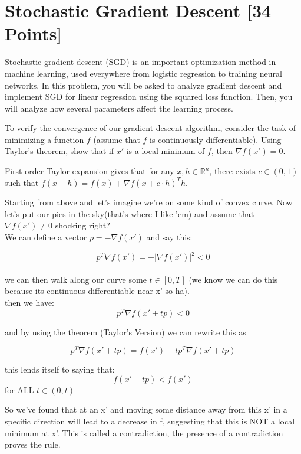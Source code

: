 
\newpage
\section{Stochastic Gradient Descent [34 Points]}

Stochastic gradient descent (SGD) is an important optimization method in machine learning, used everywhere from logistic regression to training neural networks. In this problem, you will be asked to analyze gradient descent and implement SGD for linear regression using the squared loss function. Then, you will analyze how several parameters affect the learning process.

\begin{problem}[3]
    To verify the convergence of our gradient descent algorithm, consider the task of minimizing a function $f$ (assume that $f$ is continuously differentiable). Using Taylor's theorem, show that if $x'$ is a local minimum of $f$, then $\nabla f(x') = 0$. 
\end{problem}
\begin{hint}
  First-order Taylor expansion gives that for any $x, h \in \mathbb{R}^n$, there exists $c \in (0, 1)$ such that $f(x + h) = f(x) + \nabla f(x + c\cdot h)^T h$.
  
\end{hint}
\begin{solution}
Starting from above and let's imagine we're on some kind of convex curve. Now let's put our pies in the sky(that's where I like 'em) and assume that $\nabla f(x') \not= 0$ shocking right? \\

We can define a vector $p=-\nabla f(x')$ and say this:

$$p^T \nabla f(x') = -|\nabla f(x')|^2 < 0$$\\

we can then walk along our curve some $t \in [0,T]$ (we know we can do this because its continuous differentiable near x' so ha).
\\
then we have:
$$p^T \nabla f(x'+tp) < 0$$

and by using the theorem (Taylor's Version) we can rewrite this as

$$p^T \nabla f(x'+tp) = f(x') + t p^T \nabla f(x'+tp)$$

this lends itself to saying that:
$$f(x'+tp) < f(x')$$ for ALL $t \in (0,t)$

So we've found that at an x' and moving some distance away from this x' in a specific direction will lead to a decrease in f, suggesting that this is NOT a local minimum at x'. This is called a contradiction, the presence of a contradiction proves the rule.

\end{solution}

